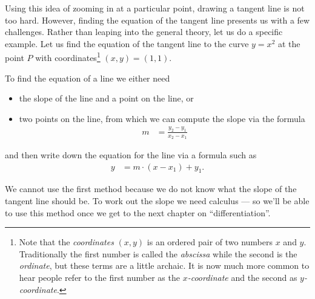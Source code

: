 Using this idea of zooming in at a particular point, drawing a tangent line is
not too hard. However,  finding the equation of the tangent line presents us
with a few challenges. Rather than leaping into the general  theory, let us do a
specific example. Let us find the equation of the tangent line to the curve
$y=x^2$ at the point $P$ with coordinates\footnote{
Note that the \emph{coordinates} $(x,y)$ is an ordered pair of two numbers $x$
and $y$. Traditionally the first number is called the \emph{abscissa} while the
second is the \emph{ordinate}, but these terms are a little archaic. It is now
much more common to hear people refer to the first number as
the \emph{$x$-coordinate} and the second as \emph{$y$-coordinate}.}
$(x,y)=(1,1)$.

To find the equation of a line we either need
\begin{itemize}
 \item the slope of the line and a point on the line, or
 \item two points on the line, from which we can compute the slope via the
formula
\begin{align*}
  m &= \frac{y_2 - y_1}{x_2 - x_1}
\end{align*}
\end{itemize}
and then write down the equation for the line via a formula such as
\begin{align*}
  y &= m \cdot(x - x_1) + y_1.
\end{align*}


We cannot use the first method because we do not know what the slope of the
tangent line should be. To work out the slope we need calculus --- so we'll
be able to use this method once we get to the next chapter on
``differentiation''.

